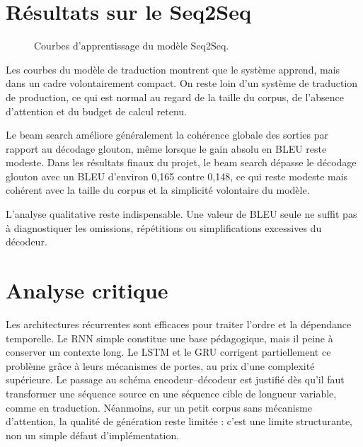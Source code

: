 \section{Résultats sur le Seq2Seq}
\begin{figure}[H]
    \centering
    \caption{Courbes d’apprentissage du modèle Seq2Seq.}
\end{figure}
Les courbes du modèle de traduction montrent que le système apprend, mais dans un cadre volontairement compact. On reste loin d’un système de traduction de production, ce qui est normal au regard de la taille du corpus, de l’absence d’attention et du budget de calcul retenu.

\begin{table}[H]
    \centering
    \caption{Scores BLEU du système Seq2Seq selon la stratégie de décodage.}
\end{table}
Le beam search améliore généralement la cohérence globale des sorties par rapport au décodage glouton, même lorsque le gain absolu en BLEU reste modeste.
Dans les résultats finaux du projet, le beam search dépasse le décodage glouton avec un BLEU d’environ 0,165 contre 0,148, ce qui reste modeste mais cohérent avec la taille du corpus et la simplicité volontaire du modèle.

\begin{table}[H]
    \centering
    \caption{Exemples qualitatifs de traductions générées.}
\end{table}
L’analyse qualitative reste indispensable. Une valeur de BLEU seule ne suffit pas à diagnostiquer les omissions, répétitions ou simplifications excessives du décodeur.

\section{Analyse critique}
Les architectures récurrentes sont efficaces pour traiter l’ordre et la dépendance temporelle. Le RNN simple constitue une base pédagogique, mais il peine à conserver un contexte long. Le LSTM et le GRU corrigent partiellement ce problème grâce à leurs mécanismes de portes, au prix d’une complexité supérieure. Le passage au schéma encodeur--décodeur est justifié dès qu’il faut transformer une séquence source en une séquence cible de longueur variable, comme en traduction. Néanmoins, sur un petit corpus sans mécanisme d’attention, la qualité de génération reste limitée : c’est une limite structurante, non un simple défaut d’implémentation.

